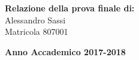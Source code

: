 \begin{titlepage}
        \begin{flushright}
            {\large \textbf{Relazione della prova finale di:}} \\
            \large{Alessandro Sassi} \\
            \large{Matricola 807001}
        \end{flushright}
        
        \vspace{36mm}
        \begin{center}
            {\large{\bf Anno Accademico 2017-2018}}
        \end{center}

        \restoregeometry
        
    \end{titlepage}
    

   
